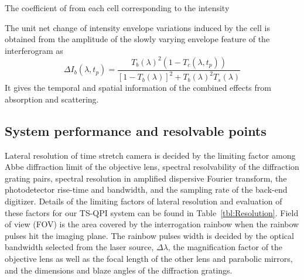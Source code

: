 \documentclass[aps,pra,reprint,superscriptaddress]{revtex4-1}
\begin{document}
The coefficient of  from each cell corresponding to the intensity  

The unit net change of intensity envelope variations induced by the cell is obtained from the amplitude of the slowly varying envelope feature of the interferogram as
\begin{equation}
\Delta I_b(\lambda, t_p) = \frac{T_b(\lambda)^2 (1 - T_c(\lambda, t_p))}{[1-T_b(\lambda)]^2 + T_b(\lambda)^2 T_s(\lambda)}
\end{equation}
It gives the temporal and spatial information of the combined effects from absorption and scattering. 


\subsection{System performance and resolvable points}

Lateral resolution of time stretch camera is decided by the limiting factor among Abbe diffraction limit of the objective lens, spectral resolvability of the diffraction grating pairs, spectral resolution in amplified dispersive Fourier transform, the photodetector rise-time and bandwidth, and the sampling rate of the back-end digitizer. Details of the limiting factors of lateral resolution and evaluation of these factors for our TS-QPI system can be found in Table~\ref{tbl:Resolution}. Field of view (FOV) is the area covered by the interrogation rainbow when the rainbow pulses hit the imaging plane. The rainbow pulses width is decided by the optical bandwidth selected from the laser source, $\Delta\lambda$, the magnification factor of the objective lens as well as the focal length of the other lens and parabolic mirrors, and the dimensions and blaze angles of the diffraction gratings.
\end{document}
